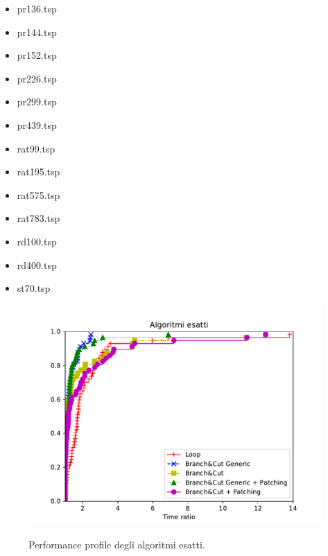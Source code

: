 \begin{center}
\begin{multicols}{4}
\begin{itemize}
\item{pr136.tsp}
\item{pr144.tsp}
\item{pr152.tsp}
\item{pr226.tsp}
\item{pr299.tsp}
\item{pr439.tsp}
\item{rat99.tsp}
\item{rat195.tsp}
\item{rat575.tsp}
\item{rat783.tsp}
\item{rd100.tsp}
\item{rd400.tsp}
\item{st70.tsp}
\end{itemize}
\end{multicols}
\end{center}

\begin{figure}[h] 
\begin{center} 
  \includegraphics[scale=0.8]{Images/pp_exact}\\ 
  \caption{\footnotesize{Performance profile degli algoritmi esatti.}}
  \label{perf_profile} 
\end{center} 
\end{figure}


